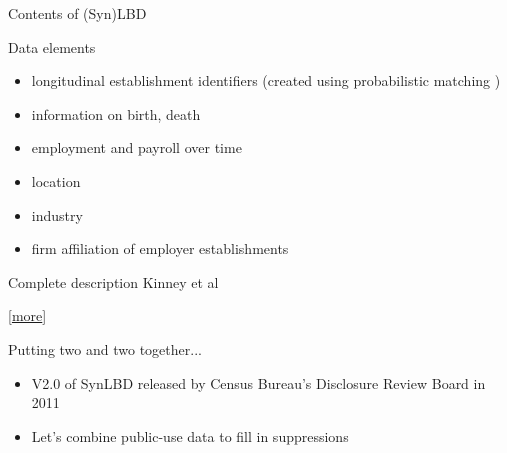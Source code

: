 \begin{frame}{Contents of (Syn)LBD}
\begin{block}{Data elements}
\begin{itemize}
\item  longitudinal establishment identifiers (created using probabilistic matching \cite{MirandaJarmin2002}) 
\item information on birth, death 
\item  employment and payroll over time 
\item location 
\item industry 
\item firm  affiliation of  employer establishments 
\end{itemize}
\end{block}
\pause
\pause
\begin{block}{Complete description}
Kinney et al \cite{KinneyEtAl2011}
\end{block}
\tiny \hfill[\hyperref[sec:SynLBD_details]{more}]
\end{frame}

\begin{frame}
\begin{block}{Putting two and two together...}
\begin{itemize}[<+->]
\item[] 
V2.0 of SynLBD released by Census Bureau's Disclosure Review Board in 2011
\item[]
Let's combine public-use data to fill in suppressions

\end{itemize}
\end{block}
\end{frame}



